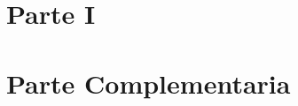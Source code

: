 \documentclass[12pt,a4paper]{article} %
\begin{document}
\tableofcontents %

\clearpage
\listoffigures %



\newpage




\section{Parte I}






\clearpage
\section{Parte Complementaria}





\end{document}
